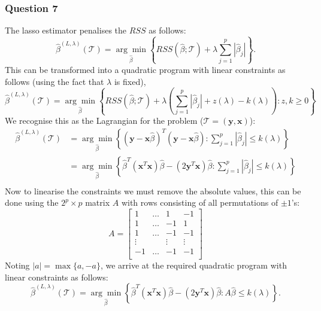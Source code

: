 \documentclass{article}
\begin{document}
\subsubsection{Question 7}
\vspace{-0.3cm}
The lasso estimator penalises the $RSS$ as follows:
\begin{equation}
\hat{\beta}^{(L,\lambda)}(\mathcal{T})=\underset{\hat{\beta}}{\arg\min} \left \{ RSS \left (\hat{\beta};\mathcal{T} \right )+\lambda \sum_{j=1}^p \left | \hat{\beta}_j \right | \right \}.
\end{equation}
This can be transformed into a quadratic program with linear constraints as follows (using the fact that $\lambda$ is fixed),
\begin{equation*}
\hat{\beta}^{(L,\lambda)}(\mathcal{T}) = \underset{\hat{\beta}}{\arg\min} \left \{ RSS \left (\hat{\beta};\mathcal{T} \right )+\lambda \left ( \sum_{j=1}^p \left | \hat{\beta}_j \right | + z(\lambda) - k(\lambda) \right) : z,k \geq 0 \right \} 
\end{equation*}
We recognise this as the Lagrangian for the problem ($\mathcal{T}=(\textbf{y},\textbf{x})$):
\begin{equation*}
\begin{split}
\hat{\beta}^{(L,\lambda)}(\mathcal{T}) &= \underset{\hat{\beta}}{\arg\min} \left \{ (\textbf{y} - \textbf{x}\hat{\beta})^T (\textbf{y} - \textbf{x}\hat{\beta}) : \sum_{j=1}^p \left | \hat{\beta}_j \right | \leq k(\lambda) \right \} \\
&= \underset{\hat{\beta}}{\arg\min} \left \{ \hat{\beta}^T(\textbf{x}^T\textbf{x})\hat{\beta}-(2\textbf{y}^T\textbf{x})\hat{\beta} :\sum_{j=1}^p \left | \hat{\beta}_j \right | \leq k(\lambda) \right \} \\
\end{split}
\end{equation*}
Now to linearise the constraints we must remove the absolute values, this can be done using the $2^p \times p$ matrix $A$ with rows consisting of all permutations of $\pm 1$'s:
\begin{equation*}
A=
\begin{bmatrix}
1 & \dots & 1 & -1 \\
1 & \dots & -1 & 1 \\
1 & \dots & -1 & -1 \\
\vdots & & \vdots & \vdots \\
-1 & \dots & -1 & -1 \\
\end{bmatrix}
\end{equation*}
Noting $|a| =\max\{a,-a\}$, we arrive at the required quadratic program with linear constraints as follows:
\begin{equation*}
\hat{\beta}^{(L,\lambda)}(\mathcal{T}) = \underset{\hat{\beta}}{\arg\min} \left \{ \hat{\beta}^T(\textbf{x}^T\textbf{x})\hat{\beta}-(2\textbf{y}^T\textbf{x})\hat{\beta} : A\hat{\beta} \leq k(\lambda) \right \}.
\end{equation*}
\end{document}
